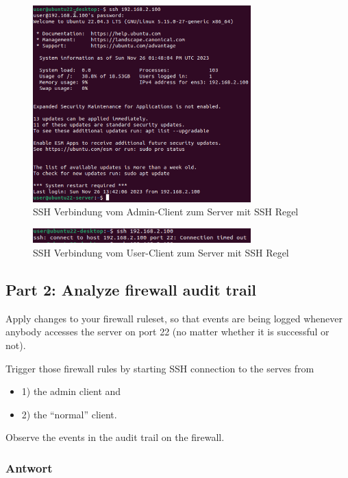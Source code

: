 \documentclass{article}
\begin{document}
\begin{figure}[H]
	\includegraphics[width=0.75\textwidth]{images/11}
	\centering
	\caption{SSH Verbindung vom Admin-Client zum Server mit SSH Regel}
\end{figure}

\begin{figure}[H]
	\includegraphics[width=0.75\textwidth]{images/12}
	\centering
	\caption{SSH Verbindung vom User-Client zum Server mit SSH Regel}
\end{figure}


\subsection{Part 2: Analyze firewall audit trail}

Apply changes to your firewall ruleset, so that events are being logged whenever 
anybody accesses the server on port 22 (no matter whether it is successful or not). 

Trigger those firewall rules by starting SSH connection to the serves from 

\begin{itemize}
    \item 1) the admin client and 
    \item 2) the “normal” client. 
\end{itemize}

Observe the events in the audit trail on the firewall. 

\subsubsection*{Antwort}
\end{document}
